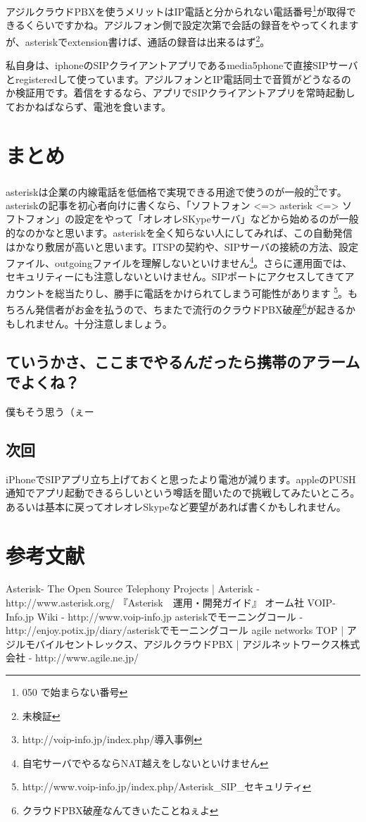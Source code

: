 アジルクラウドPBXを使うメリットはIP電話と分かられない電話番号\footnote{050 で始まらない番号}が取得できるくらいですかね。アジルフォン側で設定次第で会話の録音をやってくれますが、asteriskでextension書けば、通話の録音は出来るはず\footnote{未検証}。

私自身は、iphoneのSIPクライアントアプリであるmedia5phoneで直接SIPサーバとregisteredして使っています。アジルフォンとIP電話同士で音質がどうなるのか検証用です。着信をするなら、アプリでSIPクライアントアプリを常時起動しておかねばならず、電池を食います。

\section{まとめ}
asteriskは企業の内線電話を低価格で実現できる用途で使うのが一般的\footnote{http://voip-info.jp/index.php/導入事例}です。asteriskの記事を初心者向けに書くなら、「ソフトフォン <=> asterisk <=> ソフトフォン」の設定をやって「オレオレSKypeサーバ」などから始めるのが一般的なのかなと思います。asteriskを全く知らない人にしてみれば、この自動発信はかなり敷居が高いと思います。ITSPの契約や、SIPサーバの接続の方法、設定ファイル、outgoingファイルを理解しないといけません\footnote{自宅サーバでやるならNAT越えをしないといけません}。さらに運用面では、セキュリティーにも注意しないといけません。SIPポートにアクセスしてきてアカウントを総当たりし、勝手に電話をかけられてしまう可能性があります \footnote{http://www.voip-info.jp/index.php/Asterisk\_SIP\_セキュリティ}。もちろん発信者がお金を払うので、ちまたで流行のクラウドPBX破産\footnote{クラウドPBX破産なんてきぃたことねぇよ}が起きるかもしれません。十分注意しましょう。

\subsection{ていうかさ、ここまでやるんだったら携帯のアラームでよくね？}
僕もそう思う（ぇー

\subsection{次回}
iPhoneでSIPアプリ立ち上げておくと思ったより電池が減ります。appleのPUSH通知でアプリ起動できるらしいという噂話を聞いたので挑戦してみたいところ。あるいは基本に戻ってオレオレSkypeなど要望があれば書くかもしれません。

\section{参考文献}
Asterisk- The Open Source Telephony Projects | Asterisk - http://www.asterisk.org/
『Asterisk　運用・開発ガイド』 オーム社
VOIP-Info.jp Wiki - http://www.voip-info.jp
asteriskでモーニングコール - http://enjoy.potix.jp/diary/asteriskでモーニングコール
agile networks TOP | アジルモバイルセントレックス、アジルクラウドPBX | アジルネットワークス株式会社 - http://www.agile.ne.jp/

